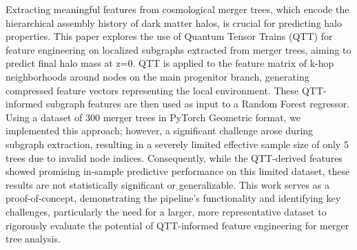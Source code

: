 \documentclass[twocolumn]{aastex631}
\begin{document}
Extracting meaningful features from cosmological merger trees, which encode the hierarchical assembly history of dark matter halos, is crucial for predicting halo properties. This paper explores the use of Quantum Tensor Trains (QTT) for feature engineering on localized subgraphs extracted from merger trees, aiming to predict final halo mass at z=0. QTT is applied to the feature matrix of k-hop neighborhoods around nodes on the main progenitor branch, generating compressed feature vectors representing the local environment. These QTT-informed subgraph features are then used as input to a Random Forest regressor. Using a dataset of 300 merger trees in PyTorch Geometric format, we implemented this approach; however, a significant challenge arose during subgraph extraction, resulting in a severely limited effective sample size of only 5 trees due to invalid node indices. Consequently, while the QTT-derived features showed promising in-sample predictive performance on this limited dataset, these results are not statistically significant or generalizable. This work serves as a proof-of-concept, demonstrating the pipeline's functionality and identifying key challenges, particularly the need for a larger, more representative dataset to rigorously evaluate the potential of QTT-informed feature engineering for merger tree analysis.
\end{document}
